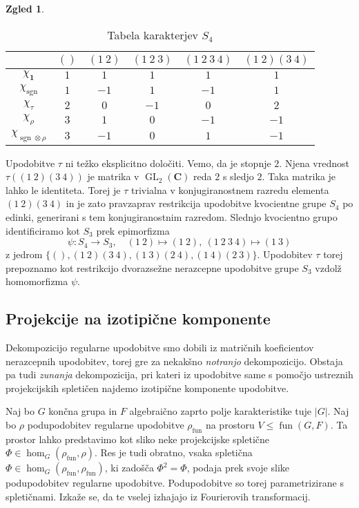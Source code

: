 \documentclass[11pt]{book}
\def\CC{\mathbf{C}}
\def\11{\mathbf{1}}
\DeclareMathOperator\sgn{sgn}
\DeclareMathOperator\fun{fun}
\DeclareMathOperator\GL{GL}
\theoremstyle{definition}
\theoremstyle{zgled}
\newtheorem*{zgled}{Zgled}
\theoremstyle{odprtproblem}
\theoremstyle{domacanaloga}
\theoremstyle{izrek}
\begin{document}
\begin{zgled}
\begin{table}[t]
    \centering
\begin{tabular}{c|ccccc}
    & $()$ & $(1 \ 2)$ & $(1 \ 2 \ 3)$ &  $(1 \ 2 \ 3 \ 4)$ &  $(1 \ 2)(3 \ 4)$\\ \hline
    $\chi_{\11}$ & $1$ & $1$ & $1$ & $1$ & $1$ \\
    $\chi_{\sgn}$ & $1$ & $-1$ & $1$ & $-1$ & $1$ \\
    $\chi_{\tau}$ & $2$ & $0$ & $-1$ & $0$ & $2$  \\
    $\chi_{\rho}$ & $3$ & $1$ & $0$ & $-1$ & $-1$  \\
    $\chi_{\sgn \otimes \rho}$ & $3$ & $-1$ & $0$ & $1$ & $-1$  \\
\end{tabular}
\caption{Tabela karakterjev $S_4$}
\end{table}

Upodobitve $\tau$ ni težko eksplicitno določiti. Vemo, da je stopnje $2$. Njena vrednost $\tau((1 \ 2)(3 \ 4))$ je matrika v $\GL_2(\CC)$ reda $2$ s sledjo $2$. Taka matrika je lahko le identiteta. Torej je $\tau$ trivialna v konjugiranostnem razredu elementa $(1 \ 2)(3 \ 4)$ in je zato pravzaprav restrikcija upodobitve kvocientne grupe $S_4$ po edinki, generirani s tem konjugiranostnim razredom. Slednjo kvocientno grupo identificiramo kot $S_3$ prek epimorfizma
\[
    \psi \colon S_4 \to S_3, \quad
    (1 \ 2) \mapsto (1 \ 2), \
    (1 \ 2 \ 3 \ 4) \mapsto (1 \ 3)
\]
z jedrom $\{ (), (1 \ 2)(3 \ 4), (1 \ 3)(2 \ 4), (1 \ 4)(2 \ 3) \}$. Upodobitev $\tau$ torej prepoznamo kot restrikcijo dvorazsežne nerazcepne upodobitve grupe $S_3$ vzdolž homomorfizma $\psi$.
\end{zgled}


\subsection{Projekcije na izotipične komponente}

Dekompozicijo regularne upodobitve smo dobili iz matričnih koeficientov nerazcepnih upodobitev, torej gre za nekakšno \emph{notranjo} dekompozicijo. Obstaja pa tudi \emph{zunanja} dekompozicija, pri kateri iz upodobitve same s pomočjo ustreznih projekcijskih spletičen najdemo izotipične komponente upodobitve.

Naj bo $G$ končna grupa in $F$ algebraično zaprto polje karakteristike tuje $|G|$. Naj bo $\rho$ podupodobitev regularne upodobitve $\rho_{\fun}$ na prostoru $V \leq \fun(G,F)$. Ta prostor lahko predstavimo kot sliko neke projekcijske spletične $\Phi \in \hom_G(\rho_{\fun}, \rho)$. Res je tudi obratno, vsaka spletična $\Phi \in \hom_G(\rho_{\fun}, \rho_{\fun})$, ki zadošča $\Phi^2 = \Phi$, podaja prek svoje slike podupodobitev regularne upodobitve. Podupodobitve so torej parametrizirane s spletičnami. Izkaže se, da te vselej izhajajo iz Fourierovih transformacij.
\end{document}
